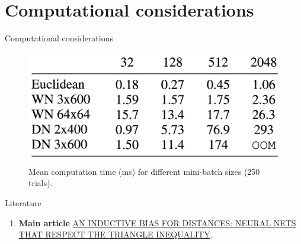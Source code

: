 \documentclass{beamer}
\begin{document}
\section{Computational considerations}
\begin{frame}{Computational considerations}
    \begin{figure}
        \centering
        \includegraphics[width=0.5\linewidth]{6.png}
        \caption{Mean computation time (ms) for
    different mini-batch sizes (250 trials).}
        \label{fig:enter-label}
    \end{figure}
\end{frame}

\begin{frame}{Literature}
    \begin{enumerate}
        \item \textbf{Main article} \href{https://arxiv.org/pdf/2002.05825.pdf}
        {AN INDUCTIVE BIAS FOR DISTANCES: NEURAL NETS
THAT RESPECT THE TRIANGLE INEQUALITY}.
    \end{enumerate}
\end{frame}
\end{document}
